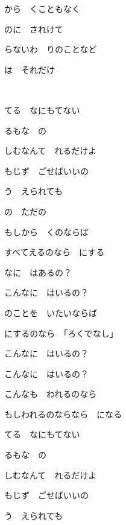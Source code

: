 \documentclass[12pt,a4paper]{article}
\begin{document}
から　くこともなく

のに　されけて

らないわ　りのことなど

は　それだけ

~

てる　なにもてない

るもな　の

しむなんて　れるだけよ

もじず　ごせばいいの

う　えられても

の　ただの

もしから　くのならば

すべてえるのなら　にする

なに　はあるの？

こんなに　はいるの？

のことを　いたいならば

にするのなら　「ろくでなし」

こんなに　はいるの？

こんなに　はいるの？

こんなも　われるのなら

もしわれるのならなら　になる

てる　なにもてない

るもな　の

しむなんて　れるだけよ

もじず　ごせばいいの

う　えられても
\end{document}
